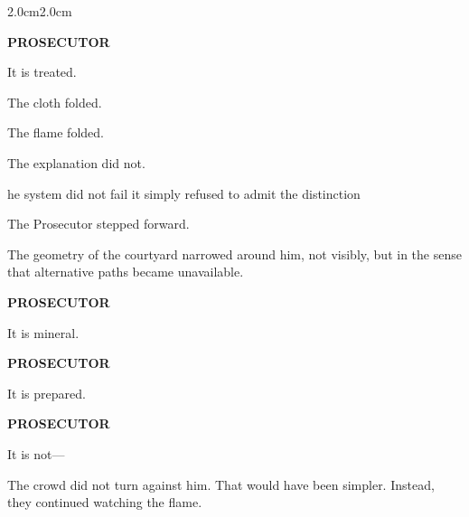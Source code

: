\begin{adjustwidth}{2.0cm}{2.0cm}

\medskip

\textbf{PROSECUTOR}

It is treated.

\medskip


\medskip


\medskip

The cloth folded.

\medskip

The flame folded.

\medskip

The explanation did not.

\medskip

he system did not fail it simply refused to admit the distinction

\medskip

The Prosecutor stepped forward.

\medskip

The geometry of the courtyard narrowed around him, not visibly, but in the
sense that alternative paths became unavailable.

\medskip

\textbf{PROSECUTOR}

It is mineral.

\medskip

\textbf{PROSECUTOR}

It is prepared.

\medskip

\textbf{PROSECUTOR}

It is not---

\medskip


\medskip


\medskip


\medskip

The crowd did not turn against him. That would have been simpler. Instead,
they continued watching the flame.

\medskip



\end{adjustwidth}
